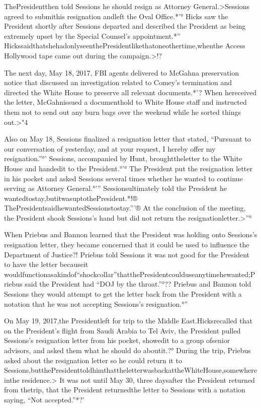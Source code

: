 {ThePresidentthen told Sessions he should resign as Attorney General.>Sessions agreed to submithis resignation andleft the Oval Office.*'° Hicks saw the President shortly after Sessions departed and described the President as being extremely upset by the Special Counsel’s appointment.*'' HickssaidthatshehadonlyseenthePresidentlikethatoneothertime,whenthe Access Hollywood tape came out during the campaign.>!?

The next day, May 18, 2017, FBI agents delivered to McGahna preservation notice that discussed an investigation related to Comey’s termination and directed the White House to preserve all relevant documents.*'? When hereceived the letter, McGahnissued a documenthold to White House staff and instructed them not to send out any burn bags over the weekend while he sorted things out.>"4

Also on May 18, Sessions finalized a resignation letter that stated, “Pursuant to our conversation of yesterday, and at your request, I hereby offer my resignation.”°' Sessions, accompanied by Hunt, broughttheletter to the White House and handedit to the President.°'° The President put the resignation letter in his pocket and asked Sessions several times whether he wanted to continue serving as Attorney General.°'” Sessionsultimately told the President he wantedtostay,butitwasuptothePresident.*!® ThePresidentsaidhewantedSessionstostay.”'® At the conclusion of the meeting, the President shook Sessions’s hand but did not return the resignationletter.>”°

When Priebus and Bannon learned that the President was holding onto Sessions’s resignation letter, they became concerned that it could be used to influence the Department of Justice?! Priebus told Sessions it was not good for the President to have the letter becauseit wouldfunctionasakindof“shockcollar”thatthePresidentcoulduseanytimehewanted;Priebus said the President had “DOJ by the throat.”°?? Priebus and Bannon told Sessions they would attempt to get the letter back from the President with a notation that he was not accepting Sessions’s resignation.°”

On May 19, 2017,the Presidentleft for trip to the Middle East.Hicksrecalled that on the President’s flight from Saudi Arabia to Tel Aviv, the President pulled Sessions’s resignation letter from his pocket, showedit to a group ofsenior advisors, and asked them what he should do aboutit.?° During the trip, Priebus asked about the resignation letter so he could return it to Sessions,butthePresidenttoldhimthattheletterwasbackattheWhiteHouse,somewhereinthe residence.> It was not until May 30, three daysafter the President returned from thetrip, that the President returnedthe letter to Sessions with a notation saying, “Not accepted.”*?’

}
